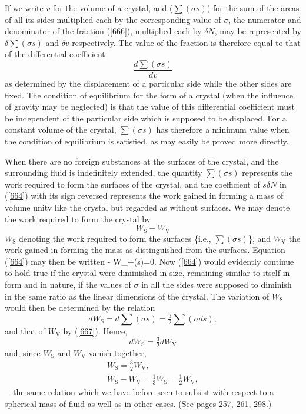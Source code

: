 \documentclass[12pt]{article}
\newcommand{\dd}{\delta}
\begin{document}
If we write $v$ for the volume of a crystal, and ($\sum(\sigma s)$) for the sum of the areas of all its sides multiplied each by the corresponding value of $\sigma$, the numerator and denominator of the fraction (\ref{666}), multiplied each by $\dd N$, may be represented by $\dd \sum(\sigma s)$ and $\dd v$ respectively. The value of the fraction is therefore equal to that of the differential coefficient 
$$ \frac{d \sum(\sigma s)}{dv} $$
as determined by the displacement of a particular side while the other sides are fixed. The condition of equilibrium for the form of a crystal (when the influence of gravity may be neglected) is that the value of this differential coefficient must be independent of the particular side which is supposed to be displaced. For a constant volume of the crystal, $\sum(\sigma s)$ has therefore a minimum value when the condition of equilibrium is satisfied, as may easily be proved more directly.

When there are no foreign substances at the surfaces of the crystal, and the surrounding fluid is indefinitely extended, the quantity $\sum(\sigma s)$ represents the work required to form the surfaces of the crystal, and the coefficient of $s \dd N$ in (\ref{664}) with its sign reversed represents the work gained in forming a mass of volume unity like the crystal but regarded as without surfaces. We may denote the work required to form the crystal by 
$$ W_\text{S}-W_\text{V} $$
$W_\text{S}$ denoting the work required to form the surfaces \{i.e., $\sum(\sigma s)$\}, and $W_\text{V}$ the work gained in forming the mass as distinguished from the surfaces. Equation (\ref{664}) may then be written
\eqs - \dd W_+\sum(\sigma \dd s)=0.  \label{667}\eqe
Now (\ref{664}) would evidently continue to hold true if the crystal were diminished in size, remaining similar to itself in form and in nature, if the values of $\sigma$ in all the sides were supposed to diminish in the same ratio as the linear dimensions of the crystal. The variation of $W_\text{S}$ would then be determined by the relation
$$dW_\text{S}= d \sum(\sigma s) = \tfrac{3}{2}\sum(\sigma ds),$$
and that of $W_\text{V}$ by (\ref{667}). Hence,
$$dW_\text{S}= \tfrac{3}{2}d W_\text{V}$$
and, since $W_\text{S}$ and $W_\text{V}$ vanish together,
\begin{align}
W_\text{S}= \tfrac{3}{2} W_\text{V}, \nonumber \\
W_\text{S}- W_\text{V} = \tfrac{1}{3}W_\text{S} = \tfrac{1}{2} W_\text{V},    \label{663}\end{align}
---the same relation which we have before seen to subsist with respect to a spherical mass of fluid as well as in other cases. (See pages 257, 261, 298.)
\end{document}
